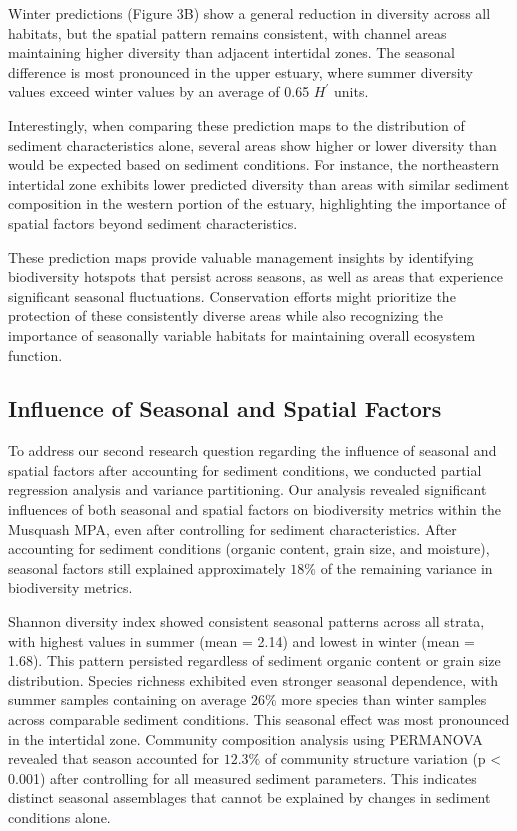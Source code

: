 \documentclass[12pt]{article}
\begin{document}
\qquad Winter predictions (Figure 3B) show a general reduction in diversity across all habitats, but the spatial pattern remains consistent, with channel areas maintaining higher diversity than adjacent intertidal zones. The seasonal difference is most pronounced in the upper estuary, where summer diversity values exceed winter values by an average of 0.65 $H^{\prime}$ units.

\qquad Interestingly, when comparing these prediction maps to the distribution of sediment characteristics alone, several areas show higher or lower diversity than would be expected based on sediment conditions. For instance, the northeastern intertidal zone exhibits lower predicted diversity than areas with similar sediment composition in the western portion of the estuary, highlighting the importance of spatial factors beyond sediment characteristics.

\qquad These prediction maps provide valuable management insights by identifying biodiversity hotspots that persist across seasons, as well as areas that experience significant seasonal fluctuations. Conservation efforts might prioritize the protection of these consistently diverse areas while also recognizing the importance of seasonally variable habitats for maintaining overall ecosystem function.


\subsection{Influence of Seasonal and Spatial Factors}

\qquad To address our second research question regarding the influence of seasonal and spatial factors after accounting for sediment conditions, we conducted partial regression analysis and variance partitioning. Our analysis revealed significant influences of both seasonal and spatial factors on biodiversity metrics within the Musquash MPA, even after controlling for sediment characteristics. After accounting for sediment conditions (organic content, grain size, and moisture), seasonal factors still explained approximately $18\%$ of the remaining variance in biodiversity metrics.

\qquad Shannon diversity index showed consistent seasonal patterns across all strata, with highest values in summer (mean = 2.14) and lowest in winter (mean = 1.68). This pattern persisted regardless of sediment organic content or grain size distribution. Species richness exhibited even stronger seasonal dependence, with summer samples containing on average $26\%$ more species than winter samples across comparable sediment conditions. This seasonal effect was most pronounced in the intertidal zone. Community composition analysis using PERMANOVA revealed that season accounted for $12.3\%$ of community structure variation (p < 0.001) after controlling for all measured sediment parameters. This indicates distinct seasonal assemblages that cannot be explained by changes in sediment conditions alone.
\end{document}
